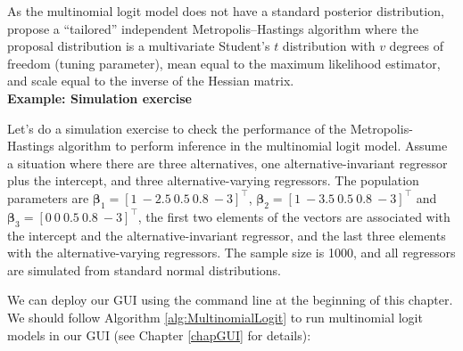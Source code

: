 As the multinomial logit model does not have a standard posterior distribution, \cite{rossi2012bayesian} propose a ``tailored'' independent Metropolis--Hastings algorithm where the proposal distribution is a multivariate Student's $t$ distribution with $v$ degrees of freedom (tuning parameter), mean equal to the maximum likelihood estimator, and scale equal to the inverse of the Hessian matrix.\\

\textbf{Example: Simulation exercise}

Let's do a simulation exercise to check the performance of the Metropolis-Hastings algorithm to perform inference in the multinomial logit model. Assume a situation where there are three alternatives, one alternative-invariant regressor plus the intercept, and three alternative-varying regressors. The population parameters are $\bm{\beta}_1=[1 \ -2.5 \ 0.5 \ 0.8 \ -3]^{\top}$, $\bm{\beta}_2=[1 \ -3.5 \ 0.5 \ 0.8 \ -3]^{\top}$ and $\bm{\beta}_3=[0 \ 0 \ 0.5 \ 0.8 \ -3]^{\top}$, the first two elements of the vectors are associated with the intercept and the alternative-invariant regressor, and the last three elements with the alternative-varying regressors. The sample size is 1000, and all regressors are simulated from standard normal distributions.

We can deploy our GUI using the command line at the beginning of this chapter. We should follow Algorithm \ref{alg:MultinomialLogit} to run multinomial logit models in our GUI (see Chapter \ref{chapGUI} for details):

